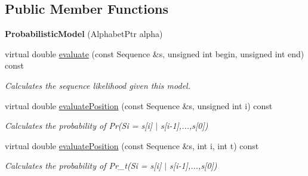 \subsection*{Public Member Functions}
\begin{DoxyCompactItemize}
\item 
\mbox{\label{classtops_1_1ProbabilisticModel_a79e266e7d01a22b1a4dea5dd3d77d468}} 
{\bfseries Probabilistic\+Model} (Alphabet\+Ptr alpha)
\item 
\mbox{\label{classtops_1_1ProbabilisticModel_a6c7312aec9b63195c18f49d75399f61f}} 
virtual double \hyperlink{classtops_1_1ProbabilisticModel_a6c7312aec9b63195c18f49d75399f61f}{evaluate} (const Sequence \&s, unsigned int begin, unsigned int end) const
\begin{DoxyCompactList}\small\item\em Calculates the sequence likelihood given this model. \end{DoxyCompactList}\item 
\mbox{\label{classtops_1_1ProbabilisticModel_aedb06966b655ff01de373fafc5449c8d}} 
virtual double \hyperlink{classtops_1_1ProbabilisticModel_aedb06966b655ff01de373fafc5449c8d}{evaluate\+Position} (const Sequence \&s, unsigned int i) const
\begin{DoxyCompactList}\small\item\em Calculates the probability of Pr(Si = s\mbox{[}i\mbox{]} $\vert$ s\mbox{[}i-\/1\mbox{]},...,s\mbox{[}0\mbox{]}) \end{DoxyCompactList}\item 
\mbox{\label{classtops_1_1ProbabilisticModel_a759335f8c811c1fcc9a64a77f3753420}} 
virtual double \hyperlink{classtops_1_1ProbabilisticModel_a759335f8c811c1fcc9a64a77f3753420}{evaluate\+Position} (const Sequence \&s, int i, int t) const
\begin{DoxyCompactList}\small\item\em Calculates the probability of Pr\+\_\+t(Si = s\mbox{[}i\mbox{]} $\vert$ s\mbox{[}i-\/1\mbox{]},...,s\mbox{[}0\mbox{]}) \end{DoxyCompactList}\item 
\mbox{\label{classtops_1_1ProbabilisticModel_a861d4381848b9e8d5794d546fd145599}} 

\end{DoxyCompactItemize}
